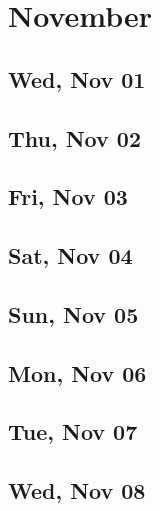 \chapter{November}
	\section{Wed, Nov 01}
		
		
	\section{Thu, Nov 02}
		
		
	\section{Fri, Nov 03}
		
		
	\section{Sat, Nov 04}
		
		
	\section{Sun, Nov 05}
		
		
	\section{Mon, Nov 06}
		
		
	\section{Tue, Nov 07}
		
		
	\section{Wed, Nov 08}
		
		

